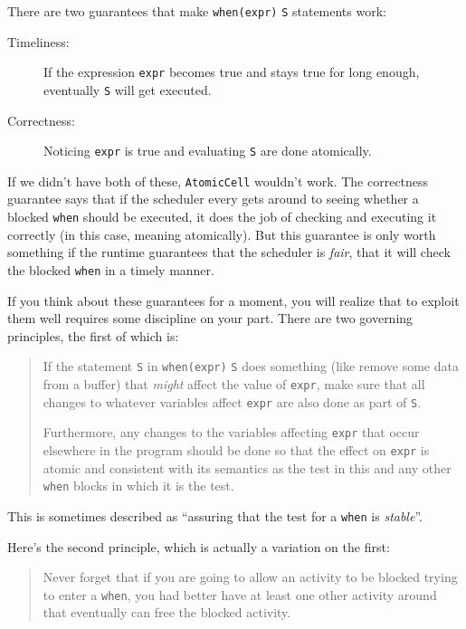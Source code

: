 
There are two guarantees that make {\tt when(expr)} {\tt S} statements work:
\begin{description}
\item[Timeliness:] If the expression  {\tt expr} becomes true and stays true for long
      enough, eventually  {\tt S} will get executed.
\item[Correctness:] Noticing {\tt expr} is true and evaluating {\tt S} are done atomically.
\end{description}
If we didn't have both of these, {\tt AtomicCell} wouldn't work.  
The correctness guarantee says that if the scheduler every gets around to 
seeing whether a blocked {\tt when} should be executed, it does the job of
checking and executing it correctly (in this case, meaning atomically).  But
this guarantee is only worth something if the runtime guarantees that the
scheduler is {\em fair}, that it will check the blocked {\tt when} in a timely
manner.  

If you think about these guarantees for a moment, you will realize that to
exploit them well requires some discipline on your part.  There are
two governing principles, the first of which is:
\begin{quote}
If the statement {\tt S} in  {\tt when(expr)} {\tt S} does something
(like remove some data from a buffer) that
{\em might} affect the value of {\tt expr}, make sure that all changes to
whatever variables affect {\tt expr} are also done as part of {\tt S}.

Furthermore, any changes to the variables affecting {\tt expr} that
occur elsewhere in the program should be done so that the effect on
{\tt expr} is atomic and consistent with its semantics as the test in
this and any other {\tt when} blocks in which it is the test.
\end{quote}

This is sometimes described as  ``assuring that the test for a 
{\tt when} is {\em stable}''.   

Here's the second principle, which is actually a variation on the first:
\begin{quote}
Never forget that if you are going to allow an activity to be blocked trying to
enter a {\tt when}, you had better have at least one other activity around that eventually
can free the blocked activity.
\end{quote}

